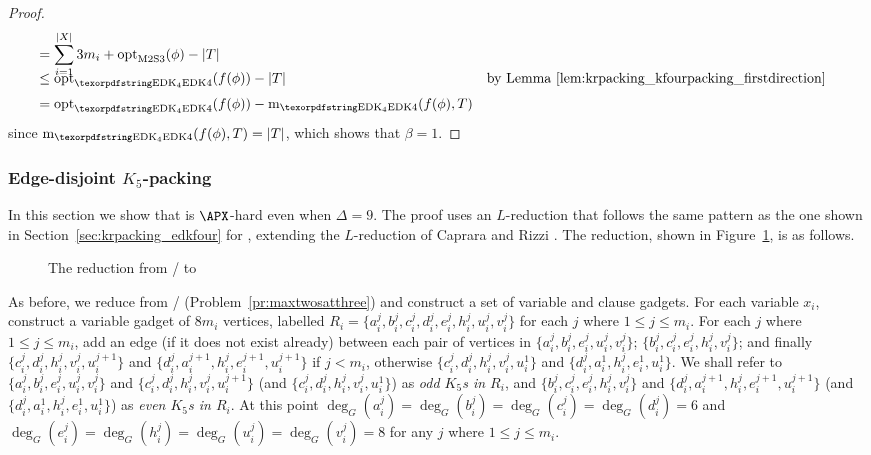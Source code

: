 \begin{proof}
\begin{align*}
    &= \sum\limits_{i=1}^{|X|} 3 m_i + \textrm{opt}_{\textrm{\maxtwosatthreeshort/}}(\phi) - |T|\\[-0.8em]
    &\leq \textrm{opt}_{\textrm{\edkfour}}(f(\phi)) - |T| && \mbox{by Lemma~\ref{lem:krpacking_kfourpacking_firstdirection}}\\[0.2em]
    &= \textrm{opt}_{\textrm{\edkfour}}(f(\phi)) - \textrm{m}_{\textrm{\edkfour}}(f(\phi), T)
\end{align*}
since $\textrm{m}_{\textrm{\edkfour}}(f(\phi), T) = |T|$, which shows that $\beta = 1$.
\end{proof}

\subsubsection{Edge-disjoint \texorpdfstring{$K_5$}{K5}-packing} 

In this section we show that \edkfive is $\APX$-hard even when $\Delta=9$. The proof uses an $L$-reduction that follows the same pattern as the one shown in Section~\ref{sec:krpacking_edkfour} for \edkfour, extending the $L$-reduction of Caprara and Rizzi \cite{caprara_packing_2002}. The reduction, shown in Figure~\ref{fig:krpacking_edkfive}, is as follows.
\begin{figure}
    \centering
    
    \caption{The reduction from \maxtwosatthree/ to \edkfive}
    \label{fig:krpacking_edkfive}
\end{figure}
As before, we reduce from \maxtwosatthree/ (Problem~\ref{pr:maxtwosatthree}) and construct a set of variable and clause gadgets. For each variable $x_i$, construct a variable gadget of $8 m_i$ vertices, labelled $R_i = \{ a_i^j, b_i^j, c_i^j, d_i^j, e_i^j, h_i^j, u_i^j, v_i^j \}$ for each $j$ where $1\leq j \leq m_i$. For each $j$ where $1\leq j \leq m_i$, add an edge (if it does not exist already) between each pair of vertices in $\{ a_i^j, b_i^j, e_i^j, u_i^j, v_i^j \}$; $\{ b_i^j, c_i^j, e_i^j, h_i^j, v_i^j \}$; and finally $\{ c_i^j, d_i^j, h_i^j, v_i^j, u_i^{j+1} \}$ and $\{ d_i^j, a_i^{j+1}, h_i^j, e_i^{j+1}, u_i^{j+1} \}$ if $j < m_i$, otherwise $\{ c_i^j, d_i^j, h_i^j, v_i^j, u_i^1 \}$ and $\{ d_i^j, a_i^1, h_i^j, e_i^1, u_i^1 \}$. We shall refer to $\{ a_i^j, b_i^j, e_i^j, u_i^j, v_i^j \}$ and $\{ c_i^j, d_i^j, h_i^j, v_i^j, u_i^{j+1} \}$ (and $\{ c_i^j, d_i^j, h_i^j, v_i^j, u_i^1 \}$) as \emph{odd $K_5$s in $R_i$}, and $\{ b_i^j, c_i^j, e_i^j, h_i^j, v_i^j \}$ and $\{ d_i^j, a_i^{j+1}, h_i^j, e_i^{j+1}, u_i^{j+1} \}$ (and $\{ d_i^j, a_i^1, h_i^j, e_i^1, u_i^1 \}$) as \emph{even $K_5$s in $R_i$}. At this point $\deg_{G}(a_i^j) = \deg_{G}(b_i^j) = \deg_{G}(c_i^j) = \deg_{G}(d_i^j) = 6$ and $\deg_{G}(e_i^j) = \deg_{G}(h_i^j) = \deg_{G}(u_i^j) = \deg_{G}(v_i^j) = 8$ for any $j$ where $1\leq j \leq m_i$. 

